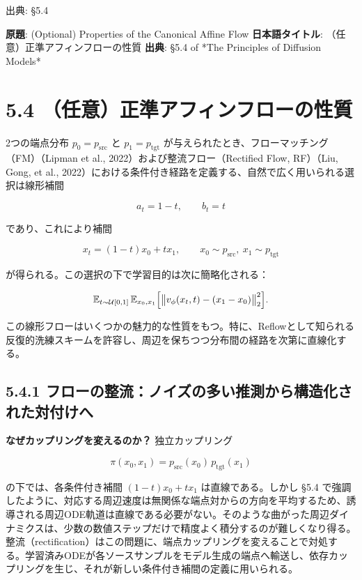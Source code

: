 

{\color{gray}\footnotesize 出典: §5.4\par}
\vspace{0.2em}
\begin{propositionbox}[原題]
\textbf{原題}: (Optional) Properties of the Canonical Affine Flow
\textbf{日本語タイトル}: （任意）正準アフィンフローの性質
\textbf{出典}: §5.4 of *The Principles of Diffusion Models*
\end{propositionbox}


\section*{5.4 （任意）正準アフィンフローの性質}


2つの端点分布 $p_0 = p_{\mathrm{src}}$ と $p_1 = p_{\mathrm{tgt}}$ が与えられたとき、フローマッチング（FM）（Lipman et al., 2022）および整流フロー（Rectified Flow, RF）（Liu, Gong, et al., 2022）における条件付き経路を定義する、自然で広く用いられる選択は線形補間

\[
a_t = 1 - t, \qquad b_t = t
\]


であり、これにより補間

\[
x_t = (1-t)x_0 + t x_1, \qquad x_0 \sim p_{\mathrm{src}},\ x_1 \sim p_{\mathrm{tgt}}
\]


が得られる。この選択の下で学習目的は次に簡略化される：

\[
\mathbb{E}_{t\sim\mathcal{U}[0,1]}\,\mathbb{E}_{x_0,x_1}\Bigl[\bigl\|v_\phi(x_t, t) - (x_1 - x_0)\bigr\|_2^2\Bigr].
\]


この線形フローはいくつかの魅力的な性質をもつ。特に、Reflowとして知られる反復的洗練スキームを許容し、周辺を保ちつつ分布間の経路を次第に直線化する。

\subsection*{5.4.1 フローの整流：ノイズの多い推測から構造化された対付けへ}


\textbf{なぜカップリングを変えるのか？} 独立カップリング

\[
\pi(x_0, x_1) = p_{\mathrm{src}}(x_0)\, p_{\mathrm{tgt}}(x_1)
\]


の下では、各条件付き補間 $(1-t)x_0 + t x_1$ は直線である。しかし §5.4 で強調したように、対応する周辺速度は無関係な端点対からの方向を平均するため、誘導される周辺ODE軌道は直線である必要がない。そのような曲がった周辺ダイナミクスは、少数の数値ステップだけで精度よく積分するのが難しくなり得る。
整流（rectification）はこの問題に、端点カップリングを変えることで対処する。学習済みODEが各ソースサンプルをモデル生成の端点へ輸送し、依存カップリングを生じ、それが新しい条件付き補間の定義に用いられる。

